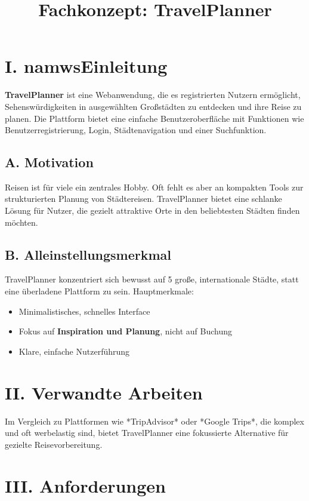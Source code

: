 \documentclass[a4paper,12pt]{article}
\title{Fachkonzept: TravelPlanner}
\author{}
\date{}
\begin{document}
    \maketitle

    \section*{I. namwsEinleitung}
    \textbf{TravelPlanner} ist eine Webanwendung, die es registrierten Nutzern ermöglicht, Sehenswürdigkeiten in ausgewählten Großstädten zu entdecken und ihre Reise zu planen.
    Die Plattform bietet eine einfache Benutzeroberfläche mit Funktionen wie Benutzerregistrierung, Login, Städtenavigation und einer Suchfunktion.

    \subsection*{A. Motivation}
    Reisen ist für viele ein zentrales Hobby. Oft fehlt es aber an kompakten Tools zur strukturierten Planung von Städtereisen.
    TravelPlanner bietet eine schlanke Lösung für Nutzer, die gezielt attraktive Orte in den beliebtesten Städten finden möchten.

    \subsection*{B. Alleinstellungsmerkmal}
    TravelPlanner konzentriert sich bewusst auf 5 große, internationale Städte, statt eine überladene Plattform zu sein.
    Hauptmerkmale:
    \begin{itemize}
        \item Minimalistisches, schnelles Interface
        \item Fokus auf \textbf{Inspiration und Planung}, nicht auf Buchung
        \item Klare, einfache Nutzerführung
    \end{itemize}

    \section*{II. Verwandte Arbeiten}
    Im Vergleich zu Plattformen wie *TripAdvisor* oder *Google Trips*, die komplex und oft werbelastig sind, bietet TravelPlanner eine fokussierte Alternative für gezielte Reisevorbereitung.

    \section*{III. Anforderungen}
\end{document}
